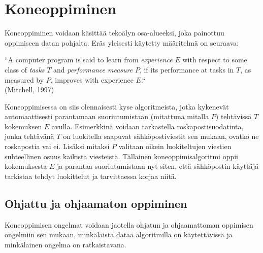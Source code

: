 \documentclass[12pt,a4paper,finnish,oneside,titlepage]{article}
\theoremstyle{plain}
\theoremstyle{definition}
\theoremstyle{remark}
\begin{document}
\section{Koneoppiminen}\label{sec:ensimmainen}
Koneoppiminen voidaan käsittää tekoälyn osa-alueeksi, joka painottuu oppimiseen datan pohjalta. Eräs yleisesti käytetty määritelmä on seuraava:
\begin{center}
``A computer program is said to learn from \emph{experience} \(E\) with respect to some class of \emph{tasks} \(T\) and \emph{performance measure} \(P\), if its performance at tasks in \(T\), as measured by \(P\), improves with experience \(E\).`` \\ (Mitchell, 1997)
\end{center}
Koneoppimisessa on siis olennaisesti kyse algoritmeista, jotka kykenevät automaattisesti parantamaan suoriutumistaan (mitattuna mitalla \(P\)) tehtävissä \(T\) kokemuksen \(E\) avulla. Esimerkkinä voidaan tarkastella roskapostisuodatinta, jonka tehtävänä \(T\) on luokitella saapuvat sähköpostiviestit sen mukaan, ovatko ne roskapostia vai ei. Lisäksi mitaksi \(P\) valitaan oikein luokiteltujen viestien suhteellinen osuus kaikista viesteistä. Tällainen koneoppimisalgoritmi oppii kokemuksesta \(E\) ja parantaa suoriutumistaan nyt siten, että sähköpostin käyttäjä tarkistaa tehdyt luokittelut ja tarvittaessa korjaa niitä.

\subsection{Ohjattu ja ohjaamaton oppiminen}
Koneoppimisen ongelmat voidaan jaotella ohjatun ja ohjaamattoman oppimisen ongelmiin sen mukaan, minkälaista dataa algoritmilla on käytettävissä ja minkälainen ongelma on ratkaistavana.
\end{document}
